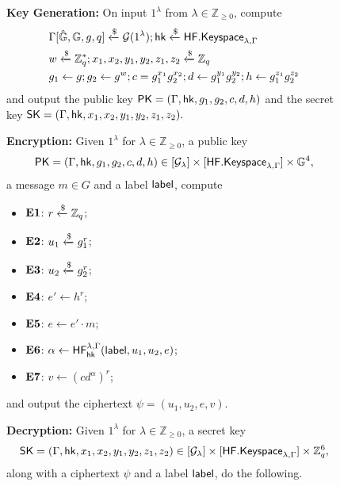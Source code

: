 	\begin{figure}
	\begin{framed}
		\textbf{Key Generation:} On input $1^\lambda$ from $\lambda\in\mathbb{Z}_{\geq 0}$, compute
		\begin{align*}
			&\Gamma[\hat{\mathbb{G}}, \mathbb{G}, g, q]\xleftarrow{\$}\mathcal{G}(1^\lambda); \mathsf{hk}\xleftarrow{\$}\mathsf{HF.Keyspace}_{\lambda,\Gamma}\\
			&w\xleftarrow{\$}\mathbb{Z}_q^{*}; x_1,x_2,y_1,y_2,z_1,z_2\xleftarrow{\$}\mathbb{Z}_q\\
			&g_1\gets g; g_2\gets g^{w}; c = g_1^{x_1}g_2^{x_2}; d\gets g_1^{y_1}g_2^{y_2}; h\gets g_1^{z_1}g_2^{z_2}
		\end{align*}
		and output the public key $\mathsf{PK} = (\Gamma,\mathsf{hk},g_1,g_2,c,d,h)$ and the secret key $\mathsf{SK} = (\Gamma, \mathsf{hk}, x_1,x_2,y_1,y_2,z_1,z_2).$
		
		\vspace{4mm}
		
		\textbf{Encryption:} Given $1^\lambda$ for $\lambda\in\mathbb{Z}_{\geq 0}$, a public key $$\mathsf{PK}=(\Gamma,\mathsf{hk},g_1,g_2,c,d,h)\in[\mathcal{G}_\lambda]\times[\mathsf{HF.Keyspace}_{\lambda,\Gamma}]\times\mathbb{G}^4,$$ a message $m\in G$ and a label $\mathsf{label}$, compute
		
		\begin{itemize}
			\itemsep=0em
			\item[]\textbf{$\mathbf{E1}$}: $r\xleftarrow{\$}\mathbb{Z}_q$;
			\item[]\textbf{$\mathbf{E2}$}: $u_1\xleftarrow{\$} g_1^r$;
			\item[]\textbf{$\mathbf{E3}$}: $u_2\xleftarrow{\$} g_2^r$;
			\item[]\textbf{$\mathbf{E4}$}: $e'\gets h^r$;
			\item[]\textbf{$\mathbf{E5}$}: $e\gets e'\cdot m$;
			\item[]\textbf{$\mathbf{E6}$}: $\alpha\gets\mathsf{HF}^{\lambda,\Gamma}_{\mathsf{hk}}(\mathsf{label}, u_1, u_2, e)$;
			\item[]\textbf{$\mathbf{E7}$}: $v\gets (cd^\alpha)^r$;
		\end{itemize}
		and output the ciphertext $\psi = (u_1, u_2, e, v)$.
		
		\vspace{4mm}
		
		\textbf{Decryption:} Given $1^\lambda$ for $\lambda\in\mathbb{Z}_{\geq 0}$, a secret key $$\mathsf{SK}=(\Gamma, \mathsf{hk}, x_1,x_2,y_1,y_2,z_1,z_2)\in[\mathcal{G}_\lambda]\times[\mathsf{HF.Keyspace}_{\lambda,\Gamma}]\times\mathbb{Z}_q^{6},$$
		along with a ciphertext $\psi$ and a label $\mathsf{label}$, do the following.
		

\end{framed}
\end{figure}
